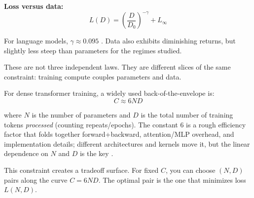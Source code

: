 \textbf{Loss versus data:}
\begin{equation}
L(D) = \left(\frac{D}{D_0}\right)^{-\gamma} + L_{\infty}
\end{equation}

For language models, $\gamma \approx 0.095$ \citep{kaplan2020scaling,hoffmann2022chinchilla}. Data also exhibits diminishing returns, but slightly less steep than parameters for the regimes studied.

These are not three independent laws. They are different slices of the same constraint: training compute couples parameters and data.

For dense transformer training, a widely used back-of-the-envelope is:
\begin{equation}
C \approx 6ND
\end{equation}

where $N$ is the number of parameters and $D$ is the total number of training tokens \emph{processed} (counting repeats/epochs). The constant 6 is a rough efficiency factor that folds together forward+backward, attention/MLP overhead, and implementation details; different architectures and kernels move it, but the linear dependence on $N$ and $D$ is the key \citep{hoffmann2022chinchilla}.

This constraint creates a tradeoff surface. For fixed $C$, you can choose $(N, D)$ pairs along the curve $C = 6ND$. The optimal pair is the one that minimizes loss $L(N, D)$.

\vspace{1.5em}

